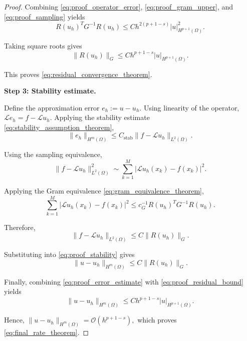 \documentclass[review]{elsarticle}
\begin{document}
\begin{proof}
Combining
\eqref{eq:proof_operator_error},
\eqref{eq:proof_gram_upper},
and
\eqref{eq:proof_sampling}
yields
\begin{equation}
R(u_h)^TG^{-1}R(u_h)
\le
Ch^{2(p+1-s)}
|u|_{H^{p+1}(\Omega)}^2.
\label{eq:proof_residual_bound_sq}
\end{equation}

Taking square roots gives
\begin{equation}
\|R(u_h)\|_G
\le
Ch^{p+1-s}
|u|_{H^{p+1}(\Omega)}.
\label{eq:proof_residual_bound}
\end{equation}

This proves
\eqref{eq:residual_convergence_theorem}.


\noindent
\textbf{Step 3: Stability estimate.}

Define the approximation error
$
e_h:=u-u_h.
$
Using linearity of the operator,
$
\mathcal{L}e_h
=
f-\mathcal{L}u_h.
$
Applying the stability estimate
\eqref{eq:stability_assumption_theorem},
\begin{equation}
\|e_h\|_{H^m(\Omega)}
\le
C_{\mathrm{stab}}
\|f-\mathcal{L}u_h\|_{L^2(\Omega)}.
\label{eq:proof_stability}
\end{equation}

Using the sampling equivalence,
\begin{equation}
\|f-\mathcal{L}u_h\|_{L^2(\Omega)}^2
\sim
\sum_{k=1}^{M}
|\mathcal{L}u_h(x_k)-f(x_k)|^2.
\label{eq:proof_sampling_residual}
\end{equation}

Applying the Gram equivalence
\eqref{eq:gram_equivalence_theorem},
\begin{equation}
\sum_{k=1}^{M}
|\mathcal{L}u_h(x_k)-f(x_k)|^2
\le
c_G^{-1}
R(u_h)^TG^{-1}R(u_h).
\label{eq:proof_gram_lower}
\end{equation}

Therefore,
\begin{equation}
\|f-\mathcal{L}u_h\|_{L^2(\Omega)}
\le
C
\|R(u_h)\|_G.
\label{eq:proof_residual_norm}
\end{equation}

Substituting into
\eqref{eq:proof_stability}
gives
\begin{equation}
\|u-u_h\|_{H^m(\Omega)}
\le
C
\|R(u_h)\|_G.
\label{eq:proof_error_estimate}
\end{equation}

Finally, combining
\eqref{eq:proof_error_estimate}
with
\eqref{eq:proof_residual_bound}
yields
\begin{equation}
\|u-u_h\|_{H^m(\Omega)}
\le
Ch^{p+1-s}
|u|_{H^{p+1}(\Omega)}.
\end{equation}

Hence,
$
\|u-u_h\|_{H^m(\Omega)}
=
\mathcal{O}(h^{p+1-s}),
$
which proves
\eqref{eq:final_rate_theorem}.

\end{proof}
\end{document}
